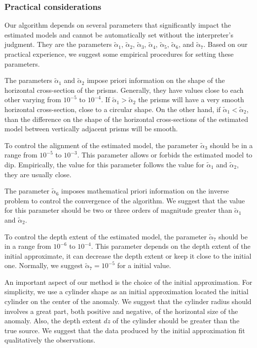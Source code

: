 \subsubsection{Practical considerations}

Our algorithm depends on several parameters that significantly impact the estimated models and cannot be automatically set without the interpreter’s judgment. They are the parameters $\tilde{\alpha}_1$, $\tilde{\alpha}_2$, $\tilde{\alpha}_3$, $\tilde{\alpha}_4$, $\tilde{\alpha}_5$, $\tilde{\alpha}_6$, and $\tilde{\alpha}_7$. Based on our practical experience, we suggest some empirical procedures for setting these parameters.

The parameters $\tilde{\alpha}_1$ and $\tilde{\alpha}_2$ impose priori information on the shape of the horizontal cross-section of the prisms. Generally, they have values close to each other varying from $10^{-5}$ to $10^{-4}$. If $\tilde{\alpha}_1 > \tilde{\alpha}_2$ the prisms will have a very smooth horizontal cross-section, close to a circular shape. On the other hand, if $\tilde{\alpha}_1 < \tilde{\alpha}_2$, than the difference on the shape of the horizontal cross-sections of the estimated model between vertically adjacent prisms will be smooth.

To control the alignment of the estimated model, the parameter $\tilde{\alpha}_3$ should be in a range from $10^{-5}$ to $10^{-3}$. This parameter allows or forbids the estimated model to dip. Empirically, the value for this parameter follows the value for $\tilde{\alpha}_1$ and $\tilde{\alpha}_2$, they are usually close.

The parameter $\tilde{\alpha}_6$ imposes mathematical priori information on the inverse problem to control the convergence of the algorithm. We suggest that the value for this parameter should be two or three orders of magnitude greater than $\tilde{\alpha}_1$ and $\tilde{\alpha}_2$.

To control the depth extent of the estimated model, the parameter $\tilde{\alpha}_7$ should be in a range from $10^{-6}$ to $10^{-4}$. This parameter depends on the depth extent of the initial approximate, it can decrease the depth extent or keep it close to the initial one. Normally, we suggest $\tilde{\alpha}_7=10^{-5}$ for a initial value.

An important aspect of our method is the choice of the initial approximation. For simplicity, we use a cylinder shape as an initial approximation located the initial cylinder on the center of the anomaly. We suggest that the cylinder radius should involves a great part, both positive and negative, of the horizontal size of the anomaly. Also, the depth extent $dz$ of the cylinder should be greater than the true source. We suggest that the data produced by the initial approximation fit qualitatively the observations.